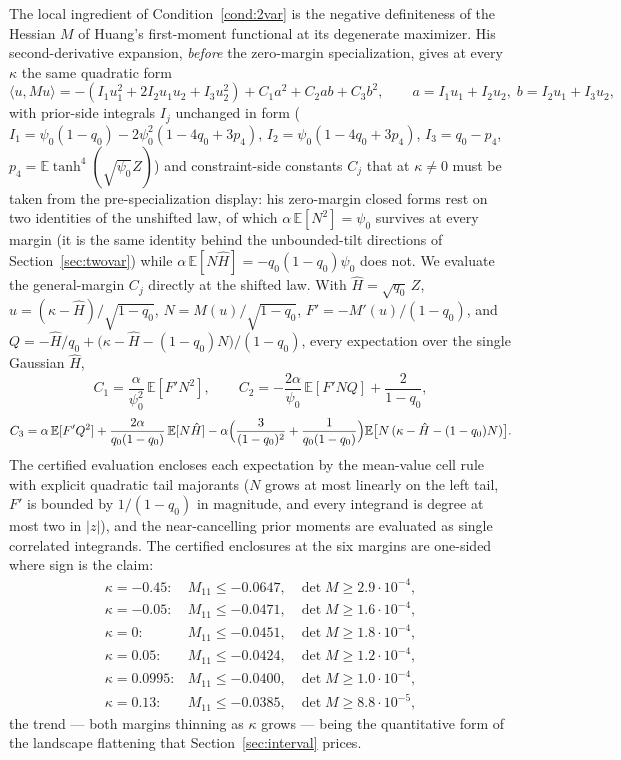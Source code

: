 \documentclass[11pt]{article}
\theoremstyle{remark}
\newcommand{\E}{\mathbb{E}}
\begin{document}
The local ingredient of Condition~\ref{cond:2var} is the negative
definiteness of the Hessian $M$ of Huang's first-moment functional at
its degenerate maximizer.  His second-derivative expansion,
\emph{before} the zero-margin specialization, gives at every $\kappa$
the same quadratic form
\[
\langle u, M u\rangle=
-(I_1u_1^2+2I_2u_1u_2+I_3u_2^2)+C_1a^2+C_2ab+C_3b^2,
\qquad a=I_1u_1+I_2u_2,\; b=I_2u_1+I_3u_2,
\]
with prior-side integrals $I_j$ unchanged in form
($I_1=\psi_0(1-q_0)-2\psi_0^2(1-4q_0+3p_4)$,
$I_2=\psi_0(1-4q_0+3p_4)$, $I_3=q_0-p_4$, $p_4=\E\tanh^4(\sqrt
{\psi_0}Z)$) and constraint-side constants $C_j$ that at
$\kappa\ne0$ must be taken from the pre-specialization display:
his zero-margin closed forms rest on two identities of the
unshifted law, of which $\alpha\,\E[N^2]=\psi_0$ survives at every
margin (it is the same identity behind the unbounded-tilt directions
of Section~\ref{sec:twovar}) while
$\alpha\,\E[N\hat H]=-q_0(1-q_0)\psi_0$ does not.  We evaluate the
general-margin $C_j$ directly at the shifted law.  With
$\hat H=\sqrt{q_0}\,Z$, $u=(\kappa-\hat H)/\sqrt{1-q_0}$,
$N=M(u)/\sqrt{1-q_0}$, $F'=-M'(u)/(1-q_0)$, and
$Q=-\hat H/q_0+\bigl(\kappa-\hat H-(1-q_0)N\bigr)/(1-q_0)$,
every expectation over the single Gaussian $\hat H$,
\[
C_1=\frac{\alpha}{\psi_0^2}\,\E[F'N^2],\qquad
C_2=-\frac{2\alpha}{\psi_0}\,\E[F'NQ]+\frac{2}{1-q_0},
\]
\[
C_3=\alpha\,\E[F'Q^2]+\frac{2\alpha}{q_0(1-q_0)}\,\E[N\hat H]
-\alpha\Bigl(\frac{3}{(1-q_0)^2}+\frac{1}{q_0(1-q_0)}\Bigr)
\E\bigl[N\,(\kappa-\hat H-(1-q_0)N)\bigr].
\]
The certified evaluation encloses each expectation by the mean-value
cell rule with explicit quadratic tail majorants ($N$ grows at most
linearly on the left tail, $F'$ is bounded by $1/(1-q_0)$ in
magnitude, and every integrand is degree at most two in $|z|$), and
the near-cancelling prior moments are evaluated as single correlated
integrands.  The certified enclosures at the six margins are
one-sided where sign is the claim:
\[
\begin{array}{lll}
\kappa=-0.45: & M_{11}\le-0.0647, & \det M\ge 2.9\cdot10^{-4},\\
\kappa=-0.05: & M_{11}\le-0.0471, & \det M\ge 1.6\cdot10^{-4},\\
\kappa=0:     & M_{11}\le-0.0451, & \det M\ge 1.8\cdot10^{-4},\\
\kappa=0.05:  & M_{11}\le-0.0424, & \det M\ge 1.2\cdot10^{-4},\\
\kappa=0.0995:& M_{11}\le-0.0400, & \det M\ge 1.0\cdot10^{-4},\\
\kappa=0.13:  & M_{11}\le-0.0385, & \det M\ge 8.8\cdot10^{-5},
\end{array}
\]
the trend --- both margins thinning as $\kappa$ grows --- being the
quantitative form of the landscape flattening that
Section~\ref{sec:interval} prices.
\end{document}
